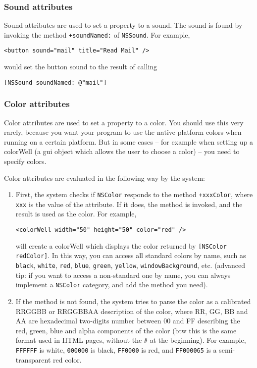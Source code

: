 \subsubsection{Sound attributes}
Sound attributes are used to set a property to a sound.  The sound is
found by invoking the method \texttt{+soundNamed:} of
\texttt{NSSound}.  For example,
\begin{verbatim}
<button sound="mail" title="Read Mail" />
\end{verbatim}
would set the button sound to the result of calling 
\begin{verbatim}
[NSSound soundNamed: @"mail"]
\end{verbatim}

\subsubsection{Color attributes}
Color attributes are used to set a property to a color.  You should
use this very rarely, because you want your program to use the native
platform colors when running on a certain platform.  But in some cases
-- for example when setting up a colorWell (a gui object which allows
the user to choose a color) -- you need to specify colors.

Color attributes are evaluated in the following way by the system: 
\begin{enumerate}
\item First, the system checks if \texttt{NSColor} responds to the
  method \texttt{+xxxColor}, where \texttt{xxx} is the value of the
  attribute.  If it does, the method is invoked, and the result is
  used as the color.  For example,
\begin{verbatim}
<colorWell width="50" height="50" color="red" />
\end{verbatim}
  will create a colorWell which displays the color returned by
  \texttt{[NSColor redColor]}.  In this way, you can access all
  standard colors by name, such as \texttt{black}, \texttt{white},
  \texttt{red}, \texttt{blue}, \texttt{green}, \texttt{yellow},
  \texttt{windowBackground}, etc.  (advanced tip: if you want to
  access a non-standard one by name, you can always implement a
  \texttt{NSColor} category, and add the method you need).
\item If the method is not found, the system tries to parse the color
  as a calibrated RRGGBB or RRGGBBAA description of the color, where
  RR, GG, BB and AA are hexadecimal two-digits number between 00 and
  FF describing the red, green, blue and alpha components of the color
  (btw this is the same format used in HTML pages, without the
  \texttt{\#} at the beginning).  For example, \texttt{FFFFFF} is
  white, \texttt{000000} is black, \texttt{FF0000} is red, and
  \texttt{FF000065} is a semi-transparent red color.
\end{enumerate}

